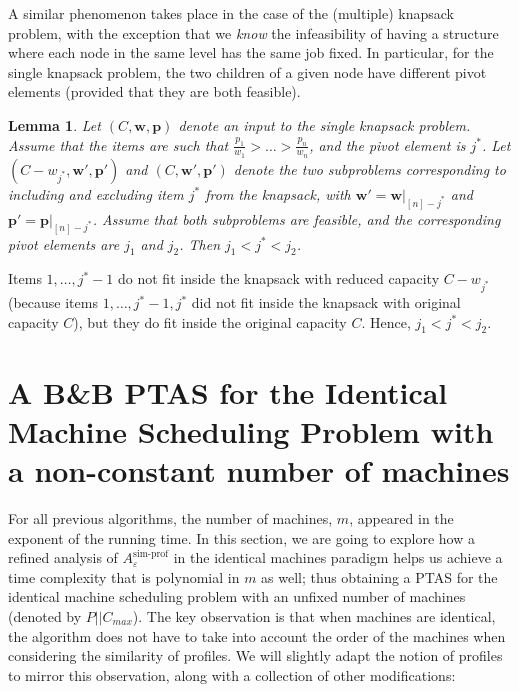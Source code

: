 \documentclass[moor,sglanonrev]{informs4}
\theoremstyle{plain}
\newtheorem{lmm}{Lemma}  %
\begin{document}
A similar phenomenon takes place in the case of the (multiple) knapsack problem, with the exception that we \emph{know} the infeasibility of having a structure where each node in the same level has the same job fixed. In particular, for the single knapsack problem, the two children of a given node have different pivot elements (provided that they are both feasible).

\begin{lmm}
    Let $(C, \bm{w}, \bm{p})$ denote an input to the single knapsack problem. Assume that the items are such that $\frac{p_1}{w_1} > \ldots > \frac{p_n}{w_n}$, and the pivot element is $j^*$. Let $(C-w_{j^*}, \bm{w}', \bm{p}')$ and $(C, \bm{w}', \bm{p}')$ denote the two subproblems corresponding to including and excluding item $j^*$ from the knapsack, with $\bm{w}' = \bm{w}|_{[n]-j^*}$ and $\bm{p}' = \bm{p}|_{[n]-j^*}$. Assume that both subproblems are feasible, and the corresponding pivot elements are $j_1$ and $j_2$. Then $j_1 < j^* < j_2$.
\end{lmm}

    Items $1, \ldots, j^* -1$ do not fit inside the knapsack with reduced capacity $C-w_{j^*}$ (because items $1, \ldots, j^*-1, j^*$ did not fit inside the knapsack with original capacity $C$), but they do fit inside the original capacity $C$. Hence, $j_1 < j^* < j_2$. \hfill \Halmos
\endproof

\section{A B\&B PTAS for the Identical Machine Scheduling Problem with a non-constant number of machines}\label{sec:js_ptas_m}

For all previous algorithms, the number of machines, $m$, appeared in the exponent of the running time. In this section, we are going to explore how a refined analysis of $A^{\text{sim-prof}}_{\varepsilon}$ in the identical machines paradigm helps us achieve a time complexity that is polynomial in $m$ as well; thus obtaining a PTAS for the identical machine scheduling problem with an unfixed number of machines (denoted by $P||C_{max}$). The key observation is that when machines are identical, the algorithm does not have to take into account the order of the machines when considering the similarity of profiles. We will slightly adapt the notion of profiles to mirror this observation, along with a collection of other modifications:
\end{document}
